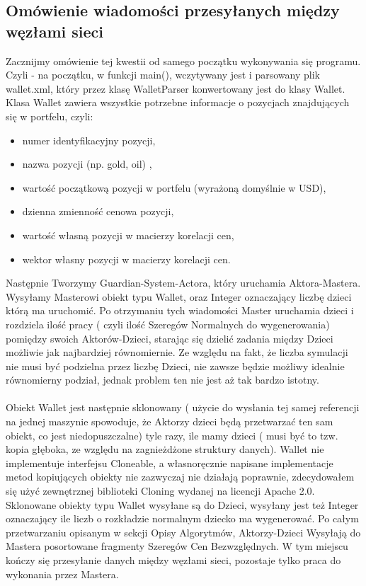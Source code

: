 \documentclass[11pt,titlepage]{article}
\numberwithin{equation}{section}
\begin{document}
\subsection{Omówienie wiadomości przesyłanych między węzłami sieci}

Zacznijmy omówienie tej kwestii od samego początku wykonywania się programu. Czyli - na początku, w funkcji main(), wczytywany jest i parsowany plik wallet.xml, który przez klasę WalletParser konwertowany jest do klasy Wallet. Klasa Wallet zawiera wszystkie potrzebne informacje o pozycjach znajdujących się w portfelu, czyli:
\begin{itemize}
  \item numer identyfikacyjny pozycji,
	\item nazwa pozycji (np. gold, oil) ,
	\item wartość początkową pozycji w portfelu (wyrażoną domyślnie w USD),
	\item dzienna zmienność cenowa pozycji,
	\item wartość własną pozycji w macierzy korelacji cen,
	\item wektor własny pozycji w macierzy korelacji cen.

\end{itemize}

Następnie Tworzymy Guardian-System-Actora, który uruchamia Aktora-Mastera. Wysyłamy Masterowi  obiekt typu Wallet, oraz Integer oznaczający liczbę dzieci którą ma uruchomić. Po otrzymaniu tych wiadomości Master uruchamia dzieci i rozdziela ilość pracy ( czyli ilość Szeregów Normalnych do wygenerowania) pomiędzy swoich Aktorów-Dzieci, starając się dzielić zadania między Dzieci możliwie jak najbardziej równomiernie. Ze względu na fakt, że liczba symulacji nie musi być podzielna przez liczbę Dzieci, nie zawsze będzie możliwy idealnie równomierny podział, jednak problem ten nie jest aż tak bardzo istotny. \\
\\
Obiekt Wallet jest następnie sklonowany ( użycie do wysłania tej samej referencji na jednej maszynie spowoduje, że Aktorzy dzieci będą przetwarzać ten sam obiekt, co jest niedopuszczalne) tyle razy, ile mamy dzieci ( musi być to tzw. kopia głęboka, ze względu na zagnieżdżone struktury danych). Wallet nie implementuje interfejsu Cloneable, a własnoręcznie napisane implementacje metod kopiujących obiekty nie zazwyczaj nie działają poprawnie, zdecydowałem się użyć zewnętrznej biblioteki Cloning wydanej na licencji Apache 2.0. Sklonowane obiekty typu Wallet wysyłane są do Dzieci, wysyłany jest też Integer oznaczający ile liczb o rozkładzie normalnym dziecko ma wygenerować. Po całym przetwarzaniu opisanym w sekcji Opisy Algorytmów, Aktorzy-Dzieci Wysyłają do Mastera posortowane fragmenty Szeregów Cen Bezwzględnych. W tym miejscu kończy się przesyłanie danych między węzłami sieci, pozostaje tylko praca do wykonania przez Mastera.
\end{document}
